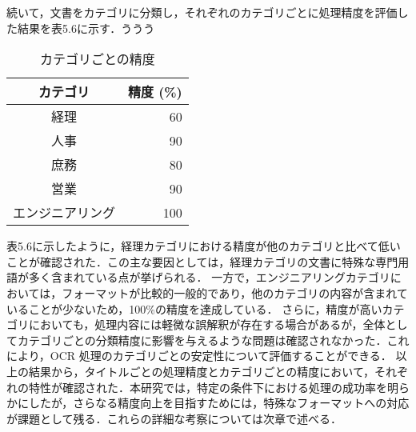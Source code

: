 続いて，文書をカテゴリに分類し，それぞれのカテゴリごとに処理精度を評価した結果を表5.6に示す．ううう

\begin{table}[h]
  \begin{center}
  \begin{tabular}{|c|r|}
    \hline
    \textbf{カテゴリ} & \textbf{精度 (\%)} \\ \hline
    経理 & 60 \\ \hline
    人事 & 90 \\ \hline
    庶務 & 80 \\ \hline
    営業 & 90 \\ \hline
    エンジニアリング & 100 \\ \hline
  \end{tabular}
  \end{center}
  \caption{カテゴリごとの精度}
  \label{tab:category_accuracy}
\end{table}

表5.6に示したように，経理カテゴリにおける精度が他のカテゴリと比べて低いことが確認された．この主な要因としては，経理カテゴリの文書に特殊な専門用語が多く含まれている点が挙げられる．
一方で，エンジニアリングカテゴリにおいては，フォーマットが比較的一般的であり，他のカテゴリの内容が含まれていることが少ないため，100\%の精度を達成している．
さらに，精度が高いカテゴリにおいても，処理内容には軽微な誤解釈が存在する場合があるが，全体としてカテゴリごとの分類精度に影響を与えるような問題は確認されなかった．これにより，OCR 処理のカテゴリごとの安定性について評価することができる．
以上の結果から，タイトルごとの処理精度とカテゴリごとの精度において，それぞれの特性が確認された．本研究では，特定の条件下における処理の成功率を明らかにしたが，さらなる精度向上を目指すためには，特殊なフォーマットへの対応が課題として残る．これらの詳細な考察については次章で述べる．
